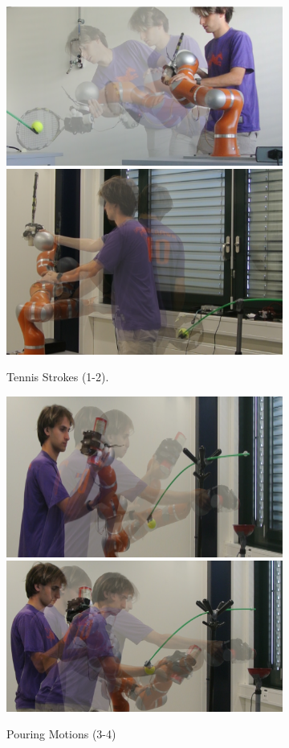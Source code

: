 \documentclass[letterpaper, 10 pt, conference,fleqn]{ieeeconf}
\begin{document}
\begin{figure}[!ht]
  \begin{minipage}[b]{0.30\textwidth}
	\centering	
		\begin{subfigure}[t]{\linewidth}
		\centering
			\includegraphics[width=0.5\linewidth]{new-pics/forehand_crop.png}\hspace{5pt}\includegraphics[width=0.43\linewidth]{new-pics/backhand_crop.png}
					\caption{Tennis Strokes (1-2).}
		\end{subfigure}
		\begin{subfigure}[t]{\linewidth}
\centering
	\includegraphics[width=0.45\linewidth]{new-pics/pour-free_crop.png}\hspace{5pt}\includegraphics[width=0.477\linewidth]{new-pics/pour-obst_crop.png}
						\caption{ Pouring Motions (3-4)}
			\end{subfigure}
			\begin{subfigure}[t]{\linewidth}		
\centering

\end{subfigure}
\end{minipage}
\end{figure}
\end{document}

